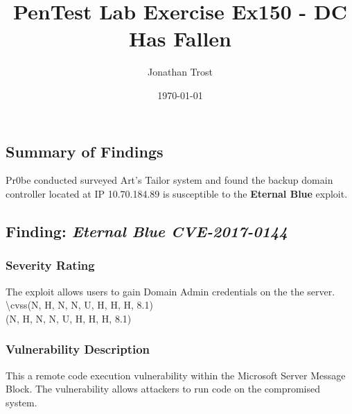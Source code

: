 \documentclass[notitlepage]{article}
\begin{document}
	
	
	\title{PenTest Lab Exercise Ex150 - DC Has Fallen}
	\author{Jonathan Trost}
	\date{\isodate\today}
	
	\maketitle
	
	\tableofcontents
	
	\newpage
	
	\subsection{Summary of Findings}
	\indent Pr0be conducted surveyed Art's Tailor system and found the backup domain controller located at IP 10.70.184.89 is susceptible to the \textbf{Eternal Blue} exploit.  
	
	\subsection{Finding: \emph{Eternal Blue CVE-2017-0144}}
	
	\subsubsection{Severity Rating}
	\indent The exploit allows users to gain Domain Admin credentials on the the server. 
	\textbackslash cvss(N, H, N, N, U, H, H, H, 8.1)\\
	\cvss(N, H, N, N, U, H, H, H, 8.1) \\
	
	\subsubsection{Vulnerability Description}
	\indent This a remote code execution vulnerability within the Microsoft Server Message Block.  The vulnerability allows attackers to run code on the compromised system.  \\
	
\end{document}
